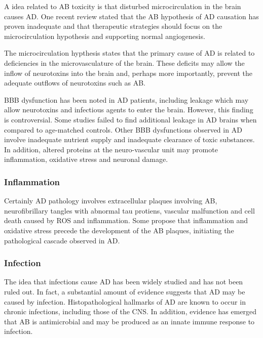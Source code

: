 \documentclass[twocolumn]{article}
\begin{document}
A idea related to AB toxicity is that disturbed microcirculation in the brain
causes AD.
\cite{de1993can}
One recent review stated that the AB hypothesis of AD causation has
proven inadequate and that therapeutic strategies should
focus on the microcirculation hypothesis and supporting normal angiogenesis.
\cite{drachman2014amyloid}

The microcirculation hypthesis states that the primary cause of
AD is related to deficiencies in the microvasculature of the brain.
These deficits may allow the inflow of neurotoxins into the brain
and, perhaps more importantly, prevent the adequate outflows of
neurotoxins such as AB.

BBB dysfunction has been noted in AD patients, including leakage which may allow
neurotoxins and infectious agents to enter the brain.
However, this finding is controversial.
Some studies failed to find additional leakage in AD brains
when compared to age-matched controls.
Other BBB dysfunctions observed in AD involve inadequate nutrient supply and
inadequate clearance of toxic substances.
In addition, altered proteins at the neuro-vascular unit may promote
inflammation, oxidative stress and neuronal damage.
\cite{erickson2013blood}


\subsubsection{Inflammation}

Certainly AD pathology involves extracellular plaques involving
AB, neurofibrillary tangles with abnormal tau protiens,
vascular malfunction
and cell death caused by ROS and inflammation.
Some propose that inflammation and oxidative stress precede
the development of the AB plaques, initiating the
pathological cascade observed in AD.
\cite{luque2014oxidative}




\subsubsection{Infection}

The idea that infections cause AD has been widely studied and
has not been ruled out. In fact,
a substantial amount of evidence suggests that
AD may be caused by infection.
Histopathological hallmarks of AD are known to occur in
chronic infections, including those of the CNS.
\cite{
iked1995numerous,
mandybur1990distribution,
kueh1984amyloid,
liberski1994transmissible,
kobayashi2008plaque,
sikorska2009ultrastructural,
de1984serum,
looi1988immunohistochemical,
rocken1999generalized,
wangel1982family,
tank2000renal,
urban1993ct}
In addition, evidence has emerged that AB is antimicrobial
and may be produced as an innate immune response to infection.
\cite{soscia2010alzheimer}
\end{document}
